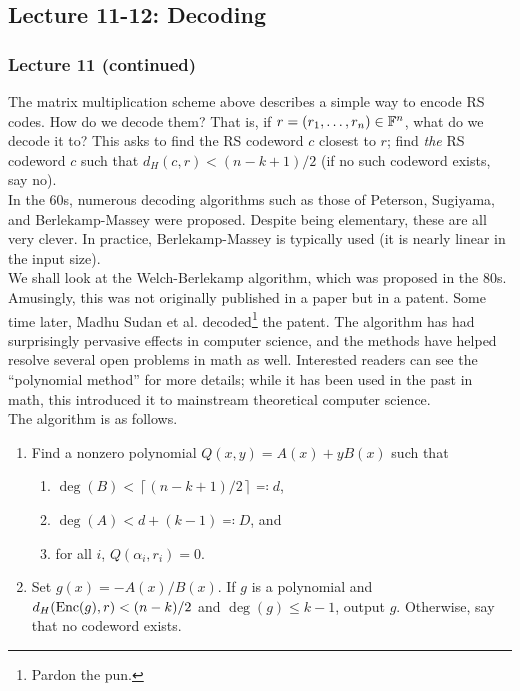 \subsection{Lecture 11-12: Decoding}

	\subsubsection{Lecture 11 (continued)}

		The matrix multiplication scheme above describes a simple way to encode RS codes. How do we decode them? That is, if $r = (r_1,\ldots,r_n) \in \mathbb{F}^n$, what do we decode it to? This asks to find the RS codeword $c$ closest to $r$; find \emph{the} RS codeword $c$ such that $d_H(c,r) < (n-k+1)/2$ (if no such codeword exists, say no). \\ %

		In the 60s, numerous decoding algorithms such as those of Peterson, Sugiyama, and Berlekamp-Massey were proposed. Despite being elementary, these are all very clever. In practice, Berlekamp-Massey is typically used (it is nearly linear in the input size).\\
		We shall look at the Welch-Berlekamp algorithm, which was proposed in the 80s. Amusingly, this was not originally published in a paper but in a patent. Some time later, Madhu Sudan et al. decoded\footnote{Pardon the pun.} the patent. The algorithm has had surprisingly pervasive effects in computer science, and the methods have helped resolve several open problems in math as well. Interested readers can see the ``polynomial method'' for more details; while it has been used in the past in math, this introduced it to mainstream theoretical computer science. \\
		The algorithm is as follows.

		\begin{enumerate}
			\item Find a nonzero polynomial $Q(x,y) = A(x) + yB(x)$ such that
			\begin{enumerate}
				\item $\deg(B) < \left\lceil (n-k+1)/2 \right\rceil \eqqcolon d$,
				\item $\deg(A) < d + (k-1) \eqqcolon D$, and
				\item for all $i$, $Q(\alpha_i,r_i) = 0$.
			\end{enumerate}
			\item Set $g(x) = -A(x)/B(x)$. If $g$ is a polynomial and $d_H(\operatorname{Enc}(g),r) < (n-k)/2$ and $\deg(g) \le k-1$, output $g$. Otherwise, say that no codeword exists.
		\end{enumerate}

